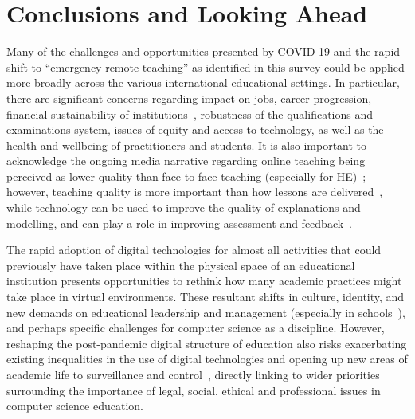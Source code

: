 \documentclass[sigconf]{acmart}
\begin{document}
\section{Conclusions and Looking Ahead}\label{conclusions}

Many of the challenges and opportunities presented by COVID-19 and the
rapid shift to ``emergency remote teaching'' as identified in this
survey could be applied more broadly across the various international
educational settings. In particular, there are significant concerns
regarding impact on jobs, career progression, financial sustainability
of institutions~\cite{watermeyer-et-al:he2020}, robustness of the
qualifications and examinations system, issues of equity and access to
technology, as well as the health and wellbeing of practitioners and
students. It is also important to acknowledge the ongoing media
narrative regarding online teaching being perceived as lower quality
than face-to-face teaching (especially for
HE)~\cite{paechter+maier:ihe2010,scbbcnews:2020}; however, teaching
quality is more important than how lessons are
delivered~\cite{eefremote:2020}, while technology can be used to
improve the quality of explanations and modelling, and can play a role
in improving assessment and feedback~\cite{eefdigtech:2019}.


The rapid adoption of digital technologies for almost all activities
that could previously have taken place within the physical space of an
educational institution presents opportunities to rethink how many
academic practices might take place in virtual environments. These
resultant shifts in culture, identity, and new demands on educational
leadership and management (especially in
schools~\cite{slameditorial:2020}), and perhaps specific challenges
for computer science as a discipline. However, reshaping the
post-pandemic digital structure of education also risks exacerbating
existing inequalities in the use of digital technologies and opening
up new areas of academic life to surveillance and
control~\cite{carriganlseblog:2020}, directly linking to wider
priorities surrounding the importance of legal, social, ethical and
professional issues in computer science education.
\end{document}
